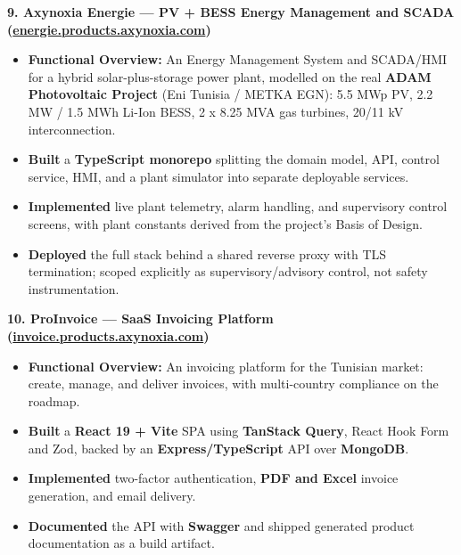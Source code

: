 \documentclass[10pt, letterpaper]{article}
\newenvironment{highlights}{
\begin{itemize}[leftmargin=12pt, itemsep=2pt]
}{
\end{itemize}
}
\begin{document}
\textbf{9. Axynoxia Energie --- PV + BESS Energy Management and SCADA (\href{https://energie.products.axynoxia.com}{energie.products.axynoxia.com})}
\begin{highlights}
\item \textbf{Functional Overview:} An Energy Management System and SCADA/HMI for a hybrid solar-plus-storage power plant, modelled on the real \textbf{ADAM Photovoltaic Project} (Eni Tunisia / METKA EGN): 5.5 MWp PV, 2.2 MW / 1.5 MWh Li-Ion BESS, 2 x 8.25 MVA gas turbines, 20/11 kV interconnection.
\item \textbf{Built} a \textbf{TypeScript monorepo} splitting the domain model, API, control service, HMI, and a plant simulator into separate deployable services.
\item \textbf{Implemented} live plant telemetry, alarm handling, and supervisory control screens, with plant constants derived from the project's Basis of Design.
\item \textbf{Deployed} the full stack behind a shared reverse proxy with TLS termination; scoped explicitly as supervisory/advisory control, not safety instrumentation.
\end{highlights}

\textbf{10. ProInvoice --- SaaS Invoicing Platform (\href{https://invoice.products.axynoxia.com}{invoice.products.axynoxia.com})}
\begin{highlights}
\item \textbf{Functional Overview:} An invoicing platform for the Tunisian market: create, manage, and deliver invoices, with multi-country compliance on the roadmap.
\item \textbf{Built} a \textbf{React 19 + Vite} SPA using \textbf{TanStack Query}, React Hook Form and Zod, backed by an \textbf{Express/TypeScript} API over \textbf{MongoDB}.
\item \textbf{Implemented} two-factor authentication, \textbf{PDF and Excel} invoice generation, and email delivery.
\item \textbf{Documented} the API with \textbf{Swagger} and shipped generated product documentation as a build artifact.
\end{highlights}
\end{document}
